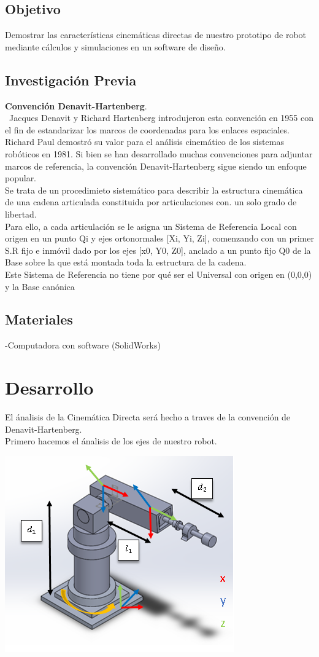 \documentclass[11pt,a4paper,oldfontcommands,oneside]{memoir}
\begin{document}
\section{Objetivo}
Demostrar las características cinemáticas directas de nuestro prototipo de robot mediante cálculos y simulaciones en un software de diseño.
\section{Investigación Previa}
\textbf{Convención Denavit-Hartenberg}. \\\
Jacques Denavit y Richard Hartenberg introdujeron esta convención en 1955 con el fin de estandarizar los marcos de coordenadas para los enlaces espaciales.
Richard Paul demostró su valor para el análisis cinemático de los sistemas robóticos en 1981. Si bien se han desarrollado muchas convenciones para adjuntar marcos de referencia, la convención Denavit-Hartenberg sigue siendo un enfoque popular. \\
Se trata de un procedimieto sistemático para describir la estructura cinemática de una cadena articulada constituida por articulaciones con. un solo grado de libertad. \\ Para ello, a cada articulación se le asigna un Sistema de Referencia Local con origen en un punto Qi y ejes ortonormales [Xi, Yi, Zi], comenzando con un primer S.R fijo e inmóvil dado por los ejes [x0, Y0, Z0], anclado a un punto fijo Q0 de la Base sobre la que está montada toda la estructura de la cadena.\\ Este Sistema de Referencia no tiene por qué ser el Universal con origen en (0,0,0) y la Base canónica
\section{Materiales}
-Computadora con software (SolidWorks) 
\chapter{Desarrollo}
El ánalisis de la Cinemática Directa será hecho a traves de la convención de Denavit-Hartenberg.\\
Primero hacemos el ánalisis de los ejes de nuestro robot.\\
\begin{center}
\includegraphics[scale=.65]{brazo.png} \\
\end{center}
\end{document}

